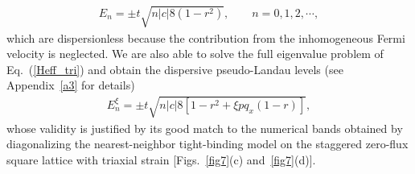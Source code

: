 \documentclass[aps, twocolumn, floatfix, superscriptaddress, prb]{revtex4-1}
\begin{document}
\begin{align}
E_n=\pm t \sqrt{n|c|8(1-r^2)},\qquad n=0, 1, 2,\cdots,
\end{align}
%
which are dispersionless because the contribution from the inhomogeneous Fermi velocity is neglected. We are also able to solve the full eigenvalue problem of Eq.~(\ref{Heff_tri}) and obtain the dispersive pseudo-Landau levels (see Appendix~\ref{a3} for details)
%
\begin{align}\label{pLL_tri}
E_n^\xi=\pm t\sqrt{n|c|8\left[1-r^2+\xi pq_x(1-r)\right]},
\end{align}
%
whose validity is justified by its good match to the numerical bands obtained by diagonalizing the nearest-neighbor tight-binding model on the staggered zero-flux square lattice with triaxial strain [Figs.~\ref{fig7}(c) and~\ref{fig7}(d)].
\end{document}
